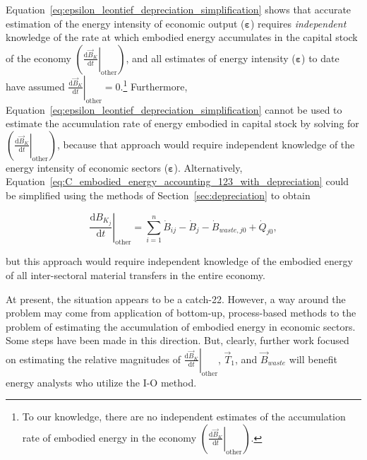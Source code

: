 Equation~\ref{eq:epsilon_leontief_depreciation_simplification} shows that 
accurate estimation of the energy intensity of economic output ($\bm{\varepsilon}$)
requires \emph{independent} knowledge of the rate 
at which embodied energy accumulates in the capital stock of the economy 
$\left( \left. \frac{\mathrm{d}\vec{B}_{K}}{\mathrm{d}t} \right|_{\mathrm{other}} \right)$,
and all estimates of energy intensity ($\bm{\varepsilon}$) to date have assumed 
$\left. \frac{\mathrm{d}\vec{B}_{K}}{\mathrm{d}t} \right|_{\mathrm{other}} = 0$.\footnote{To 
our knowledge, there are no independent estimates 
of the accumulation rate of embodied energy in the economy
$\left( \left. \frac{\mathrm{d}\vec{B}_{K}}{\mathrm{d}t} \right|_{\mathrm{other}} \right)$.}
Furthermore, Equation~\ref{eq:epsilon_leontief_depreciation_simplification} 
cannot be used to estimate the accumulation rate of energy embodied in 
capital stock by solving for 
$\left( \left. \frac{\mathrm{d}\vec{B}_{K}}{\mathrm{d}t} \right|_{\mathrm{other}} \right)$,
because that approach would require independent knowledge
of the energy intensity of economic sectors ($\bm{\varepsilon}$).
Alternatively, Equation~\ref{eq:C_embodied_energy_accounting_123_with_depreciation} 
could be simplified using the 
methods of Section~\ref{sec:depreciation} to obtain

\begin{equation} \label{eq:C_embodied_energy_accounting_123_with_depreciation_simplified}
	\left. \frac{\mathrm{d}B_{K_{j}}}{\mathrm{d}t} \right|_{\mathrm{other}}
	= \sum\limits_{i=1}^n\dot{B}_{ij} 
	- \dot{B}_{j}
	- \dot{B}_{waste,j0}
	+ \dot{Q}_{j0},
\end{equation}

\noindent{}but this approach would require independent knowledge of the 
embodied energy of all inter-sectoral material transfers in the entire economy.

At present, the situation appears to be a catch-22. 
However, a way around the problem may come from application
of bottom-up, process-based methods to the problem 
of estimating the accumulation of embodied energy 
in economic sectors. 
Some steps have been made in this direction.\cite{brandt2013calculating}
But, clearly, further work focused on estimating the relative magnitudes of 
$\left. \frac{\mathrm{d}\vec{B}_{K}}{\mathrm{d}t} \right|_{\mathrm{other}}$,
$\vec{T}_{1}$, and $\vec{B}_{waste}$ 
will benefit energy analysts who utilize the I-O method.



